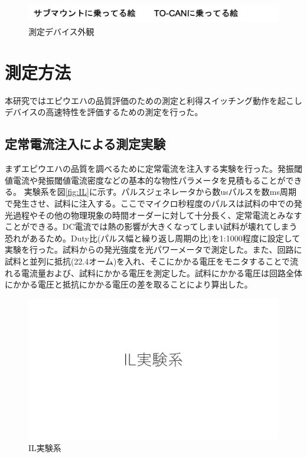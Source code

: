 \begin{figure}[htbp]
	\includegraphics[width=15cm]{figure/fig_2_1_mount.png}
	\caption{測定デバイス外観}
	\label{fig_2_1_mount}
\end{figure}

\section{測定方法}%
本研究ではエピウエハの品質評価のための測定と利得スイッチング動作を起こしデバイスの高速特性を評価するための測定を行った。
\subsection{定常電流注入による測定実験}%
まずエピウエハの品質を調べるために定常電流を注入する実験を行った。発振閾値電流や発振閾値電流密度などの基本的な物性パラメータを見積もることができる。
実験系を図\ref{fig:IL}に示す。パルスジェネレータから数usパルスを数ms周期で発生させ、試料に注入する。ここでマイクロ秒程度のパルスは試料の中での発光過程やその他の物理現象の時間オーダーに対して十分長く、定常電流とみなすことができる。DC電流では熱の影響が大きくなってしまい試料が壊れてしまう恐れがあるため。Duty比(パルス幅と繰り返し周期の比)を1:1000程度に設定して実験を行った。試料からの発光強度を光パワーメータで測定した。また、回路に試料と並列に抵抗(22.4オーム)を入れ、そこにかかる電圧をモニタすることで流れる電流量および、試料にかかる電圧を測定した。試料にかかる電圧は回路全体にかかる電圧と抵抗にかかる電圧の差を取ることにより算出した。
\begin{figure}[htbp]
	\includegraphics[width=15cm]{figure/fig_IL_setup.pdf}
	\caption{IL実験系}
	\label{fig:IL_setup}
\end{figure}


